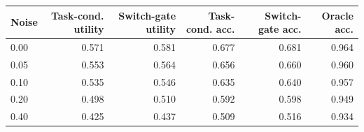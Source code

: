 \begin{tabular}{lrrrrr}
\toprule
Noise & Task-cond. utility & Switch-gate utility & Task-cond. acc. & Switch-gate acc. & Oracle acc. \\
\midrule
0.00 & 0.571 & 0.581 & 0.677 & 0.681 & 0.964 \\
0.05 & 0.553 & 0.564 & 0.656 & 0.660 & 0.960 \\
0.10 & 0.535 & 0.546 & 0.635 & 0.640 & 0.957 \\
0.20 & 0.498 & 0.510 & 0.592 & 0.598 & 0.949 \\
0.40 & 0.425 & 0.437 & 0.509 & 0.516 & 0.934 \\
\bottomrule
\end{tabular}
